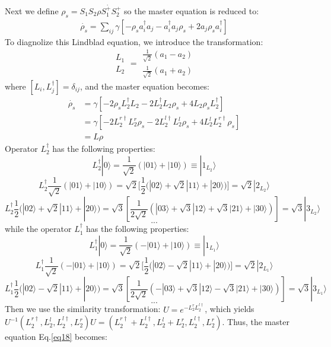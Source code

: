 \documentclass{article}
\begin{document}
Next we define $ \rho_{s}=S_{1}S_{2}\dot{\rho S_{1}^{+}S_{2}^{+}}$ so the master equation is reduced to:
\begin{equation}
\label{eq17}
\begin{split}
\dot{\rho_{s}}=\sum_{ij}\gamma[-\rho_{s}a_{i}^{\dagger}a_{j}-a_{i}^{\dagger}a_{j}\rho_{s}+2a_{j}\rho_{s}a_{i}^{\dagger}]
\end{split}
\end{equation}
To diagnolize this Lindblad equation, we introduce the transformation: $$\begin{array}{c}
L_{1}\\
L_{2}
\end{array}=\begin{array}{c}
\frac{1}{\sqrt{2}}(a_{1}-a_{2})\\
\frac{1}{\sqrt{2}}(a_{1}+a_{2})
\end{array}$$
where $[L_{i},L_{j}^{\dagger}]=\delta_{ij}$, and the master equation becomes:
\begin{equation}
\label{eq18}
\begin{split}
\dot{\rho_{s}}&=\gamma[-2\rho_{s}L_{2}^{\dagger}L_{2}-2L_{2}^{\dagger}L_{2}\rho_{s}+4L_{2}\rho_{s}L_{2}^{\dagger}]\\
&=\gamma[-2L_{2}^{r\dagger}L_{2}^{r}\rho_{s}-2L_{2}^{l\dagger}L_{2}^{l}\rho_{s}+4L_{2}^{l}L_{2}^{r\dagger}\rho_{s}]\\
&=L\rho
\end{split}
\end{equation}
Operator $L_2^{\dagger}$ has the following properties: $$L_{2}^{\dagger}|0\rangle=\frac{1}{\sqrt{2}}(|01\rangle+|10\rangle)\equiv|1_{L_2}\rangle$$ $$L_{2}^{\dagger}\frac{1}{\sqrt{2}}(|01\rangle+|10\rangle)=\sqrt{2}[\frac{1}{2}(|02\rangle+\sqrt{2}|11\rangle+|20\rangle)]=\sqrt{2}|2_{L_2}\rangle$$  $$L_{2}^{\dagger}\frac{1}{2}(|02\rangle+\sqrt{2}|11\rangle+|20\rangle)=\sqrt{3}[\frac{1}{2\sqrt{2}}(|03\rangle+\sqrt{3}|12\rangle+\sqrt{3}|21\rangle+|30\rangle)]=\sqrt{3}|3_{L_2}\rangle$$  $$...$$
while the operator $L_1^{\dagger}$ has the following properties: $$L_{1}^{\dagger}|0\rangle=\frac{1}{\sqrt{2}}(-|01\rangle+|10\rangle)\equiv|1_{L_{1}}\rangle$$ $$L_{1}^{\dagger}\frac{1}{\sqrt{2}}(-|01\rangle+|10\rangle)=\sqrt{2}[\frac{1}{2}(|02\rangle-\sqrt{2}|11\rangle+|20\rangle)]=\sqrt{2}|2_{L_{1}}\rangle$$  $$L_{1}^{\dagger}\frac{1}{2}(|02\rangle-\sqrt{2}|11\rangle+|20\rangle)=\sqrt{3}[\frac{1}{2\sqrt{2}}(-|03\rangle+\sqrt{3}|12\rangle-\sqrt{3}|21\rangle+|30\rangle)]=\sqrt{3}|3_{L_{1}}\rangle$$  $$...$$
Then we use the similarity transformation: $U=e^{-L_2^{r}L_2^{l\dagger}}$, which yields $U^{-1}(L_{2}^{r\dagger},L_{2}^{l},L_{2}^{l\dagger},L_{2}^{r})U=(L_{2}^{r\dagger}+L_{2}^{l\dagger},L_{2}^{l}+L_{2}^{r},L_{2}^{l\dagger},L_{2}^{r}) $. Thus, the master equation Eq.\eqref{eq18} becomes:
\end{document}
